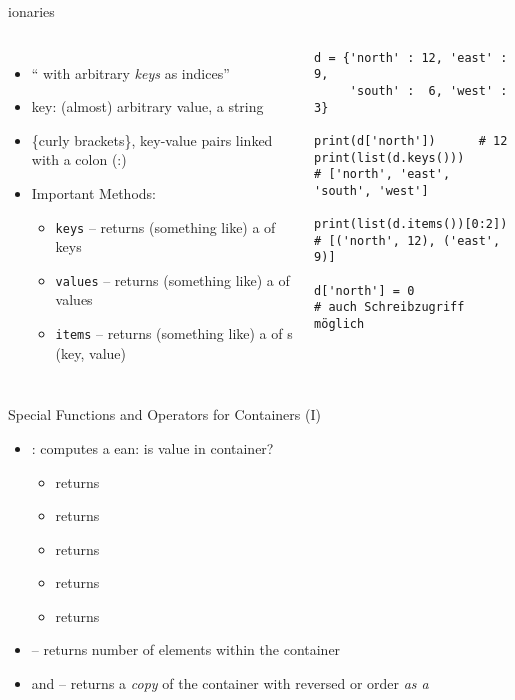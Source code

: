 \begin{frame}[fragile]{ionaries}
%
\begin{columns}[T]
\begin{itemize}
\item \enquote{ with arbitrary \emph{keys} as indices}
\item key: (almost) arbitrary value, \eg a string
\item \{curly brackets\}, key-value pairs linked with a colon (:)
\item Important Methods:
	\begin{itemize}
	\item \texttt{keys} -- returns (something like) a  of keys
	\item \texttt{values} -- returns (something like) a  of values
	\item \texttt{items} -- returns (something like) a  of s (key, value)
	\end{itemize}
\end{itemize}
%
\begin{codebox}
\begin{verbatim}
d = {'north' : 12, 'east' : 9,
     'south' :  6, 'west' : 3}

print(d['north'])      # 12
print(list(d.keys()))
# ['north', 'east', 'south', 'west']

print(list(d.items())[0:2])
# [('north', 12), ('east', 9)]

d['north'] = 0
# auch Schreibzugriff möglich
\end{verbatim}
\end{codebox}
\end{columns}
%
\end{frame}


\begin{frame}[fragile]{Special Functions and Operators for Containers (I)}
%
\begin{itemize}
\item {}: computes a ean: is value in container?
	\begin{itemize}
	\item \inPy{1 in [1, 2, 3]} returns 
	\item {} returns 
	\item {} returns 
	\item {} returns 
	\item {} returns 
	\end{itemize}
\item {} -- returns number of elements within the container
\item {} and  -- returns a \emph{copy} of the container with reversed or order \emph{as a }
\end{itemize}
%
\end{frame}

